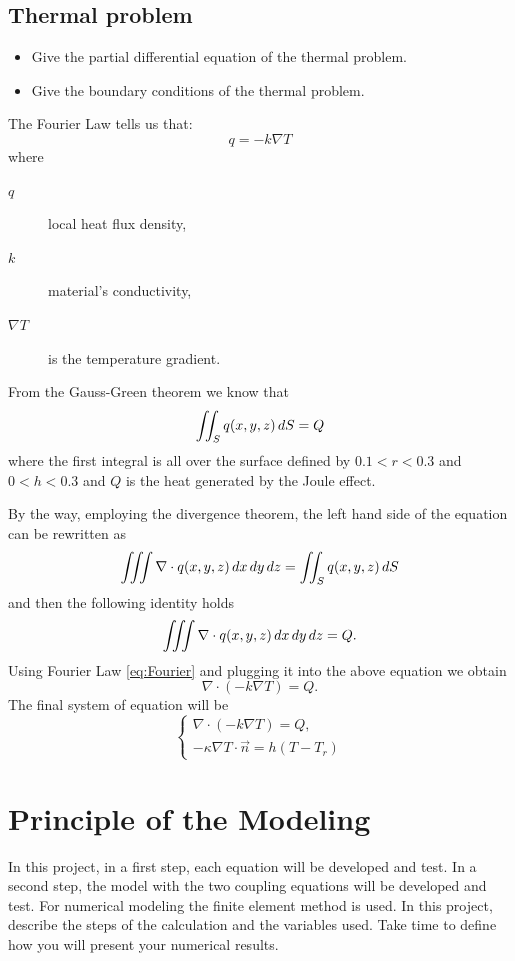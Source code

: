 \subsection{Thermal problem}
\begin{itemize}
	\item Give the partial differential equation of the thermal problem.
	\item Give the boundary conditions of the thermal problem.
\end{itemize}
\begin{mdframed}
	The Fourier Law tells us that:
	\begin{equation}
	\label{eq:Fourier}
	q=-k\nabla T
	\end{equation}
	where
	\begin{description}
		\item[$ q$] local heat flux density,
		\item[$ k $] material's conductivity,
		\item[$ \nabla T $] is the temperature gradient. 
	\end{description}
	From the Gauss-Green theorem we know that 
	\[
	\iint_S q(x,y,z) \mathop{}\!d S=Q
	\]
	where the first integral is all over the surface defined by $ 0.1<r<0.3 $ and $ 0<h<0.3 $ and $ Q $ is the heat generated by the Joule effect.
	
	By the way, employing the divergence theorem, the left hand side of the equation can be rewritten as  
	\[ \iiint \nabla\cdot q(x,y,z) \mathop{}\!d x\mathop{}\!d y\mathop{}\!d z = \iint_S q(x,y,z) \mathop{}\!d S  \]
	and then the following identity holds
	\begin{equation}
	\iiint \nabla\cdot q(x,y,z) \mathop{}\!d x\mathop{}\!d y\mathop{}\!d z = Q.
	\end{equation}
	Using Fourier Law \eqref{eq:Fourier} and plugging it into the above equation we obtain
	\begin{equation}
	\nabla\cdot(-k\nabla T)=Q.
	\end{equation}
	The final system of equation will be
	\begin{equation}
	\label{problem:heat}
	\begin{cases}
		\nabla\cdot(-k\nabla T)=Q, \\
		-\kappa\nabla T\cdot \vec{n}=h(T-T_r)
	\end{cases}
	\end{equation}
\end{mdframed}

	
\section{Principle of the Modeling}
In this project, in a first step, each equation will be developed and test. In a second step, the model with the
two coupling equations will be developed and test. For numerical modeling the finite element method is
used. In this project, describe the steps of the calculation and the variables used. Take time to define how you
will present your numerical results.
